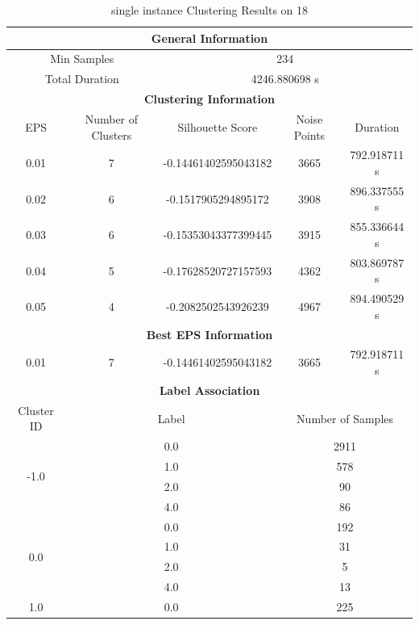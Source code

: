 \begin{longtable}{|c|c|c|c|c|}
\caption{single instance Clustering Results on 18} \label{tab:18_single_instance_clustering_results}\\
\hline
\multicolumn{5}{|c|}{\textbf{General Information}} \\
\hline
\multicolumn{2}{|c|}{Min Samples} & \multicolumn{3}{c|}{234} \\
\multicolumn{2}{|c|}{Total Duration} & \multicolumn{3}{c|}{4246.880698 s} \\
\hline
\multicolumn{5}{|c|}{\textbf{Clustering Information}} \\
\hline
EPS & Number of Clusters & Silhouette Score & Noise Points & Duration \\
0.01 & 7 & -0.14461402595043182 & 3665 & 792.918711 s\\
0.02 & 6 & -0.1517905294895172 & 3908 & 896.337555 s\\
0.03 & 6 & -0.15353043377399445 & 3915 & 855.336644 s\\
0.04 & 5 & -0.17628520727157593 & 4362 & 803.869787 s\\
0.05 & 4 & -0.2082502543926239 & 4967 & 894.490529 s\\
\hline
\multicolumn{5}{|c|}{\textbf{Best EPS Information}} \\
\hline
0.01 & 7 & -0.14461402595043182 & 3665 & 792.918711 s\\
\hline
\multicolumn{5}{|c|}{\textbf{Label Association}} \\
\hline
Cluster ID & \multicolumn{2}{c|}{Label} & \multicolumn{2}{c|}{Number of Samples} \\
\hline
\multirow{4}{*}{-1.0} & \multicolumn{2}{c|}{0.0} & \multicolumn{2}{c|}{2911} \\
& \multicolumn{2}{c|}{1.0} & \multicolumn{2}{c|}{578} \\
& \multicolumn{2}{c|}{2.0} & \multicolumn{2}{c|}{90} \\
& \multicolumn{2}{c|}{4.0} & \multicolumn{2}{c|}{86} \\
\hline
\multirow{4}{*}{0.0} & \multicolumn{2}{c|}{0.0} & \multicolumn{2}{c|}{192} \\
& \multicolumn{2}{c|}{1.0} & \multicolumn{2}{c|}{31} \\
& \multicolumn{2}{c|}{2.0} & \multicolumn{2}{c|}{5} \\
& \multicolumn{2}{c|}{4.0} & \multicolumn{2}{c|}{13} \\
\hline
\multirow{4}{*}{1.0} & \multicolumn{2}{c|}{0.0} & \multicolumn{2}{c|}{225} \\

\end{longtable}
